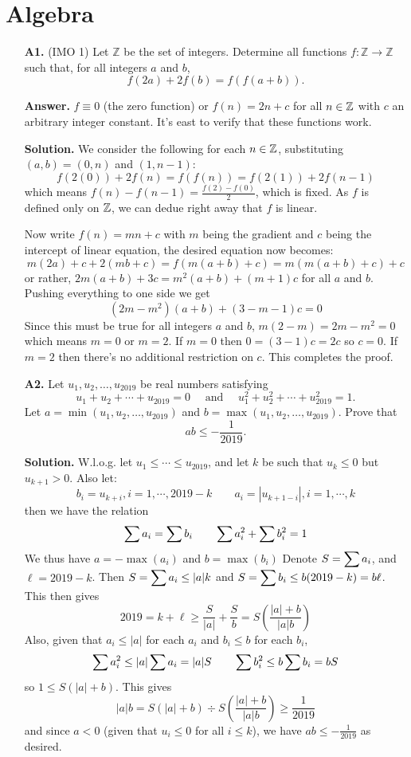 \documentclass[11pt,a4paper]{article}
\begin{document}
\section*{Algebra}
\begin{enumerate}
	\item [\textbf{A1.}] (IMO 1)
	Let $\mathbb{Z}$ be the set of integers. Determine all functions $f: \mathbb{Z} \rightarrow \mathbb{Z}$ such that, for all integers $a$ and $b$, $$f(2a)+2f(b)=f(f(a+b)).$$
	
	\textbf{Answer.} $f\equiv 0$ (the zero function) or $f(n)=2n+c$ for all $n\in{\mathbb Z}$ with $c$ an arbitrary integer constant. It's east to verify that these functions work. 
	
	\textbf{Solution.} We consider the following for each $n\in{\mathbb Z}$, substituting $(a, b)=(0, n)$ and $(1, n-1)$: 
	\[
	f(2(0)) + 2f(n) = f(f(n)) = f(2(1))+2f(n-1)
	\]
	which means $f(n)-f(n-1)=\frac{f(2)-f(0)}{2}$, which is fixed. As $f$ is defined only on ${\mathbb Z}$, we can dedue right away that $f$ is linear. 
	
	Now write $f(n)=mn+c$ with $m$ being the gradient and $c$ being the intercept of linear equation, the desired equation now becomes: 
	\[m(2a)+c + 2(mb+c) = f(m(a+b)+c) = m(m(a+b)+c)+c
	\]
	or rather, $2m(a+b)+3c = m^2(a+b) + (m+1)c$ for all $a$ and $b$. Pushing everything to one side we get 
	\[
	(2m-m^2)(a+b)+(3-m-1)c = 0
	\]
	Since this must be true for all integers $a$ and $b$, $m(2-m)=2m-m^2=0$ which means $m=0$ or $m=2$. 
	If $m=0$ then $0=(3-1)c=2c$ so $c=0$. If $m=2$ then there's no additional restriction on $c$. This completes the proof. 
	
	\item [\textbf{A2.}]
	Let $u_1, u_2, \dots, u_{2019}$ be real numbers satisfying \[u_{1}+u_{2}+\cdots+u_{2019}=0 \quad \text { and } \quad u_{1}^{2}+u_{2}^{2}+\cdots+u_{2019}^{2}=1.\]Let $a=\min \left(u_{1}, u_{2}, \ldots, u_{2019}\right)$ and $b=\max \left(u_{1}, u_{2}, \ldots, u_{2019}\right)$. Prove that
	\[
	a b \leqslant-\frac{1}{2019}.
	\]
	
	\textbf{Solution.} W.l.o.g. let $u_1\le \cdots \le u_{2019}$, and let $k$ be such that $u_k\le 0$ but $u_{k+1}>0$. 
	Also let: 
	\[
	b_i = u_{k+i}, i=1, \cdots , 2019-k\qquad a_i = |u_{k+1-i}|, i=1,\cdots , k
	\]
	then we have the relation 
	\[
	\displaystyle\sum a_i = \displaystyle\sum b_i \qquad \displaystyle\sum a_i^2 + \displaystyle\sum b_i^2 = 1
	\]
	We thus have $a=-\max(a_i)$ and $b=\max(b_i)$
	Denote $S=\displaystyle\sum a_i$, and $\ell=2019-k$. Then $S=\displaystyle\sum a_i \le |a|k$ and $S=\displaystyle\sum b_i\le b(2019-k)=b\ell$. This then gives
	\[
	2019=k+\ell \ge \frac{S}{|a|}+\frac{S}{b}=S(\frac{|a|+b}{|a|b})
	\]
	Also, given that $a_i\le |a|$ for each $a_i$ and $b_i\le b$ for each $b_i$, 
	\[
	\displaystyle\sum a_i^2\le |a|\displaystyle\sum a_i=|a|S\qquad \displaystyle\sum b_i^2\le b\displaystyle\sum b_i = bS
	\]
	so $1\le S(|a|+b)$. This gives 
	\[
	|a|b=S(|a|+b)\div S(\frac{|a|+b}{|a|b})\ge \frac{1}{2019}
	\]
	and since $a<0$ (given that $u_i\le 0$ for all $i\le k$), we have $ab\le -\frac{1}{2019}$ as desired. 
	

\end{enumerate}
\end{document}
